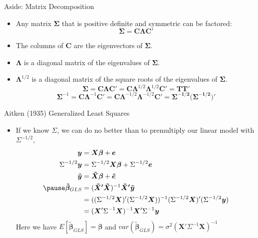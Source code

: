 \documentclass[aspectratio=169, handout]{beamer}
\numberwithin{equation}{section}
\begin{document}
\begin{frame}{Aside: Matrix Decomposition}
\begin{itemize}
\item Any matrix $\bm{\Sigma}$ that is positive definite and symmetric can be factored:
$$\bm{\Sigma}=\bm{C}\bm{\Lambda}\bm{C'}$$
\item The columns of $\bm{C}$ are the eigenvectors of $\bm{\Sigma}$.
\item $\bm{\Lambda}$ is a diagonal matrix of the eigenvalues of $\bm{\Sigma}$.
\item $\bm{\Lambda}^{1/2}$ is a diagonal matrix of the square roots of the eigenvalues of $\bm{\Sigma}$.
$$\bm{\Sigma}=\bm{C}\bm{\Lambda}\bm{C'}=\bm{C}\bm{\Lambda}^{1/2}\bm{\Lambda}^{1/2}\bm{C'}=\bm{TT'}$$
$$\bm{\Sigma}^{-1}=\bm{C}\bm{\Lambda}^{-1}\bm{C'}=\bm{C}\bm{\Lambda}^{-1/2}\bm{\Lambda}^{-1/2}\bm{C'}=\bm{\Sigma^{-1/2}(\Sigma^{-1/2}})'$$
\end{itemize}
\end{frame}

\begin{frame}{Aitken (1935) Generalized Least Squares}
\begin{itemize}
\item If we know $\Sigma$, we can do no better than to premultiply our linear model with  $\Sigma^{-1/2}$,
\begin{align*}
\bm{y}&=\bm{X\beta}+\bm{e}\\ 
\Sigma^{-1/2}\bm{y}&=\Sigma^{-1/2}\bm{X\beta}+\Sigma^{-1/2}\bm{e}\\
\bm{\tilde{y}}&=\bm{\tilde{X}\beta}+\bm{\tilde{e}}\\\pause
\bm{\tilde{\beta}}_{GLS}&=(\bm{\tilde{X}'\tilde{X}})^{-1}\bm{\tilde{X}'\tilde{y}}\\
&=((\Sigma^{-1/2}\bm{X})'(\Sigma^{-1/2}\bm{X}))^{-1}(\Sigma^{-1/2}\bm{X})'(\Sigma^{-1/2}\bm{y})\\
&=(\bm{X}'\Sigma^{-1}\bm{X})^{-1}\bm{X}'\Sigma^{-1}\bm{y}
\end{align*}
Here we have $E[\bm{\tilde{\beta}}_{GLS}]=\bm{\beta}$ and 
$var(\bm{\tilde{\beta}}_{GLS})=\sigma^2(\bm{X}'\Sigma^{-1}\bm{X})^{-1}$
\end{itemize}
\end{frame}
\end{document}
